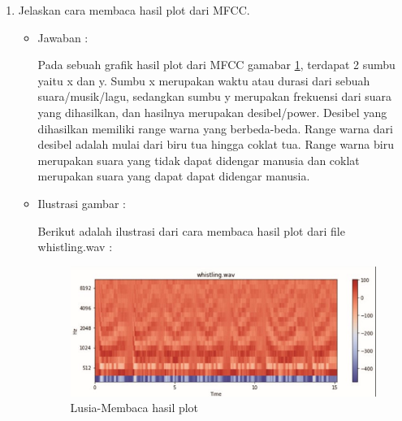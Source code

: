 \begin{enumerate}
\item Jelaskan cara membaca hasil plot dari MFCC.
	\begin{itemize}
	\item Jawaban :
		\par Pada sebuah grafik hasil plot dari MFCC gamabar \ref{6A5}, terdapat 2 sumbu yaitu x dan y. Sumbu x merupakan waktu atau durasi dari sebuah suara/musik/lagu, sedangkan sumbu y merupakan frekuensi dari suara yang dihasilkan, dan hasilnya merupakan desibel/power. Desibel yang dihasilkan memiliki range warna yang berbeda-beda. Range warna dari desibel adalah mulai dari biru tua hingga coklat tua. Range warna biru merupakan suara yang tidak dapat didengar manusia dan coklat merupakan suara yang dapat dapat didengar manusia.
	\item Ilustrasi gambar :
		\par Berikut adalah ilustrasi dari cara membaca hasil plot dari file whistling.wav :
		\begin{figure}[!hbtp]
		\centering
		\includegraphics[scale=0.5]{figures/s5.jpg}
		\caption{Lusia-Membaca hasil plot}
		\label{6A5}
		\end{figure}
	\end{itemize}


\end{enumerate}
